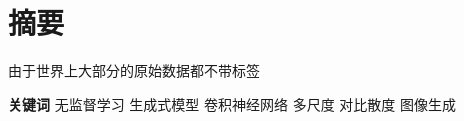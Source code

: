 \chapter*{摘要}

由于世界上大部分的原始数据都不带标签

{
    \vspace{1em}
    \setlength{\parindent}{0em}
    \textbf{关键词} \; 无监督学习 \; 生成式模型 \; 卷积神经网络 \; 多尺度 \; 对比散度 \; 图像生成 \par
}

